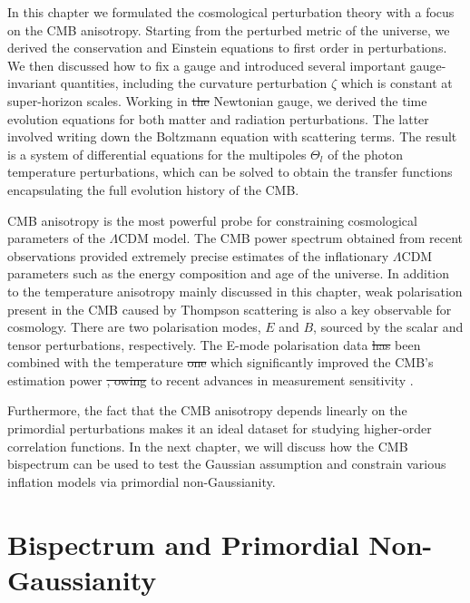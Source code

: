 \documentclass[a4paper,12pt,times,custombib,print,index]{Classes/PhDThesisPSnPDF} %
\providecommand{\DIFadd}[1]{{\protect\color{blue}\uwave{#1}}} %
\providecommand{\DIFdel}[1]{{\protect\color{red}\sout{#1}}}                      %
\providecommand{\DIFaddbegin}{} %
\providecommand{\DIFaddend}{} %
\providecommand{\DIFdelbegin}{} %
\providecommand{\DIFdelend}{} %
\newcommand{\DIFscaledelfig}{0.5}
\newlength{\DIFdelgraphicswidth} %
\newlength{\DIFdelgraphicsheight} %
\newcommand{\DIFaddincludegraphics}[2][]{{\color{blue}\fbox{\DIFOincludegraphics[#1]{#2}}}} %
\newcommand{\DIFdelincludegraphics}[2][]{%
\sbox{\DIFdelgraphicsbox}{\DIFOincludegraphics[#1]{#2}}%
\settoboxwidth{\DIFdelgraphicswidth}{\DIFdelgraphicsbox} %
\settoboxtotalheight{\DIFdelgraphicsheight}{\DIFdelgraphicsbox} %
\scalebox{\DIFscaledelfig}{%
\parbox[b]{\DIFdelgraphicswidth}{\usebox{\DIFdelgraphicsbox}\\[-\baselineskip] \rule{\DIFdelgraphicswidth}{0em}}\llap{\resizebox{\DIFdelgraphicswidth}{\DIFdelgraphicsheight}{%
\setlength{\unitlength}{\DIFdelgraphicswidth}%
\begin{picture}(1,1)%
\thicklines\linethickness{2pt} %
{\color[rgb]{1,0,0}\put(0,0){\framebox(1,1){}}}%
{\color[rgb]{1,0,0}\put(0,0){\line( 1,1){1}}}%
{\color[rgb]{1,0,0}\put(0,1){\line(1,-1){1}}}%
\end{picture}%
}\hspace*{3pt}}} %
} %
\DeclareRobustCommand{\DIFaddbegin}{\DIFOaddbegin \let\includegraphics\DIFaddincludegraphics} %
\DeclareRobustCommand{\DIFaddend}{\DIFOaddend \let\includegraphics\DIFOincludegraphics} %
\DeclareRobustCommand{\DIFdelbegin}{\DIFOdelbegin \let\includegraphics\DIFdelincludegraphics} %
\DeclareRobustCommand{\DIFdelend}{\DIFOaddend \let\includegraphics\DIFOincludegraphics} %
\begin{document}
In this chapter we formulated the cosmological perturbation theory with a focus on the CMB anisotropy. Starting from the perturbed metric of the universe, we derived the conservation and Einstein equations to first order in perturbations. We then discussed how to fix a gauge and introduced several important gauge-invariant quantities, including the curvature perturbation $\zeta$ which is constant at super-horizon scales. Working in \DIFdelbegin \DIFdel{the }\DIFdelend Newtonian gauge, we derived the time evolution equations for both matter and radiation perturbations. The latter involved writing down the Boltzmann equation with scattering terms. The result is a system of differential equations for the multipoles $\Theta_l$ of the photon temperature perturbations, which can be solved to obtain the transfer functions encapsulating the full evolution history of the CMB.

CMB anisotropy is the most powerful probe for constraining cosmological parameters of the $\Lambda$CDM model. The CMB power spectrum obtained from recent observations provided extremely precise estimates of the inflationary $\Lambda$CDM parameters such as the energy composition and age of the universe. In addition to the temperature anisotropy mainly discussed in this chapter, weak polarisation present in the CMB caused by Thompson scattering is also a key observable for cosmology. There are two polarisation modes, $E$ and $B$, \DIFaddbegin \DIFadd{mainly }\DIFaddend sourced by the scalar and tensor perturbations, respectively. The E-mode polarisation data \DIFdelbegin \DIFdel{has }\DIFdelend \DIFaddbegin \DIFadd{have }\DIFaddend been combined with the temperature \DIFdelbegin \DIFdel{one }\DIFdelend \DIFaddbegin \DIFadd{data }\DIFaddend which significantly improved the CMB's estimation power \DIFdelbegin \DIFdel{, owing }\DIFdelend \DIFaddbegin \DIFadd{thanks }\DIFaddend to recent advances in measurement sensitivity \cite{PlanckCollaboration2018Parameters}. 

Furthermore, the fact that the CMB anisotropy depends linearly on the primordial perturbations makes it an ideal dataset for studying higher-order correlation functions. In the next chapter, we will discuss how the CMB bispectrum can be used to test the Gaussian assumption and constrain various inflation models via primordial non-Gaussianity.\clearpage{}
\clearpage{}\chapter{Bispectrum and Primordial Non-Gaussianity}
\end{document}
